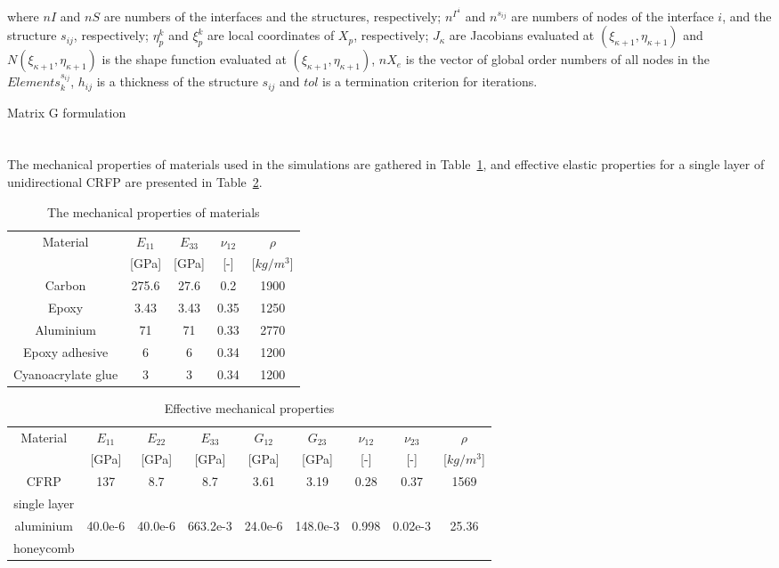\documentclass[sensors,article,submit,moreauthors,pdftex]{Definitions/mdpi}
\begin{document}
\begin{algorithm}[H]
{{		}
	}
	where \(nI\) and \(nS\) are numbers of the interfaces and the structures, respectively; \(n^{\Gamma^i}\) and \(n^{s_{ij}}\) are numbers of nodes of the interface \(i\), and the structure \(s_{ij}\), respectively; \(\eta^k_p\) and  \(\xi^k_p\) are local coordinates of \(X_p\), respectively; \(J_{\kappa}\) are Jacobians evaluated at \((\xi_{\kappa+1},\eta_{\kappa+1})\) and \(N(\xi_{\kappa+1},\eta_{\kappa+1})\) is the shape function evaluated at \((\xi_{\kappa+1},\eta_{\kappa+1})\), \(nX_e\) is the vector of global order numbers of all nodes in the \(Elements^{s_{ij}}_k\), \(h_{ij}\) is a thickness of the structure \(s_{ij}\) and \(tol\) is a termination criterion for iterations.
	\caption{Matrix G formulation}
	\label{alg:G_matrix}
\end{algorithm}
\section{}
\label{app:properties}
The mechanical properties of materials used in the simulations are gathered in Table~\ref{tab:properties}, and effective elastic properties for a single layer of unidirectional CRFP are presented in Table~\ref{tab:properties_eff}.
\begin{table}
	\centering
	\caption{\label{tab:properties}The mechanical properties of materials}
	\begin{tabular}{ccccc}\hline
		Material & \(E_{11}\) &  \(E_{33}\) & \(\nu_{12}\) & \(\rho\) \\
		& [GPa] &  [GPa] & [-] & [\(kg/m^3\)]\\
		\hline
		Carbon & 275.6 & 27.6 & 0.2 & 1900\\
		Epoxy & 3.43 & 3.43 & 0.35 & 1250\\
		Aluminium & 71 & 71 & 0.33 & 2770\\
		Epoxy adhesive & 6 & 6 & 0.34 & 1200\\
		Cyanoacrylate glue & 3 & 3 & 0.34 & 1200		
	\end{tabular}
\end{table}

\begin{table}
	\centering
	\caption{\label{tab:properties_eff} Effective mechanical properties}
	\begin{tabular}{ccccccccc}
		\hline
		Material & \(E_{11}\) & \(E_{22}\) & \(E_{33}\) & \(G_{12}\) & \(G_{23}\) & \(\nu_{12}\) 
		& \(\nu_{23}\) & \(\rho\) \\
		& \([\)GPa] & [GPa] & [GPa] & [GPa] & [GPa] & [-] & [-] & [\(kg/m^3\)]\\
		\hline
		CFRP & 137 & 8.7 & 8.7 & 3.61 & 3.19 & 0.28 & 0.37 & 1569\\
		single layer & & & & & & & &\\ \hline
		aluminium & 40.0e-6 & 40.0e-6 & 663.2e-3 & 24.0e-6 & 148.0e-3 & 0.998 & 0.02e-3 & 25.36\\
		honeycomb & & & & & & & &\\
		\hline
	\end{tabular}
\end{table}
\end{document}
